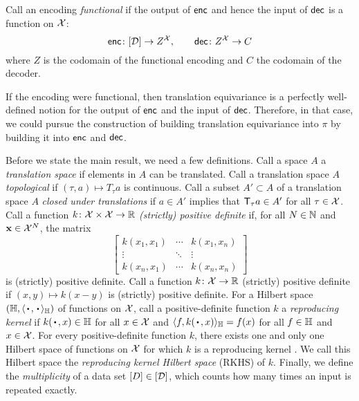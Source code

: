 \documentclass[12pt, twoside]{report}
\begin{document}
\begin{definition}
    \label{def:functional_encoding}
    Call an encoding \emph{functional} if the output of $\mathsf{enc}$ and hence the input of $\mathsf{dec}$ is a function on $\mathcal{X}$:
    \begin{equation}
        \mathsf{enc}\colon [\mathcal{D}] \to Z^{\mathcal{X}}, \qquad
        \mathsf{dec}\colon Z^{\mathcal{X}} \to C
    \end{equation}
    where $Z$ is the codomain of the functional encoding and $C$ the codomain of the decoder. 
\end{definition}

If the encoding were functional, then translation equivariance is a perfectly well-defined notion for the output of $\mathsf{enc}$ and the input of $\mathsf{dec}$.
Therefore, in that case, we could pursue the construction of building translation equivariance into $\pi$ by building it into $\mathsf{enc}$ and $\mathsf{dec}$.

Before we state the main result, we need a few definitions.
Call a space $A$ a \emph{translation space} if elements in $A$ can be translated.
Call a translation space $A$ \emph{topological} if $(\tau, a) \mapsto T_\tau a$ is continuous.
Call a subset $A' \subset A$ of a translation space $A$ \emph{closed under translations} if $a \in A'$ implies that $\T_\tau a \in A'$ for all $\tau \in \mathcal{X}$.
Call a function $k\colon \mathcal{X} \times \mathcal{X} \to \mathbb{R}$ \emph{(strictly) positive definite} if, for all $N \in \mathbb{N}$ and $\mathbf{x} \in \mathcal{X}^N$, the matrix
\begin{equation}
    \begin{bmatrix}
        k(x_1, x_1) & \cdots & k(x_1, x_n) \\
        \vdots & \ddots & \vdots \\
        k(x_n, x_1) & \cdots & k(x_n, x_n)
    \end{bmatrix}
\end{equation}
is (strictly) positive definite.
Call a function $k \colon \mathcal{X} \to \mathbb{R}$ (strictly) positive definite if $(x, y) \mapsto k(x - y)$ is (strictly) positive definite. 
For a Hilbert space $(\Hb, \lra{\vardot,\vardot}_\Hb)$ of functions on $\mathcal{X}$, call a positive-definite function $k$ a \emph{reproducing kernel} if $k(\vardot, x) \in \Hb$ for all $x \in \mathcal{X}$ and $\lra{f, k(\vardot, x)}_\Hb = f(x)$ for all $f \in \mathbb{H}$ and $x \in \mathcal{X}$.
For every positive-definite function $k$, there exists one and only one Hilbert space of functions on $\mathcal{X}$ for which $k$ is a reproducing kernel \parencite[Moore--Aronszajn theorem; Section 2;][]{Aronszajn:1950:Theory_of_Reproducing_Kernels}.
We call this Hilbert space the \emph{reproducing kernel Hilbert space} (RKHS) of $k$.
Finally, we define the \emph{multiplicity} of a data set $[D] \in [\mathcal{D}]$, which counts how many times an input is repeated exactly.
\end{document}
